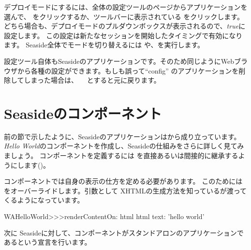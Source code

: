\documentclass[a4paper,10pt,twoside]{book}
\begin{document}
{{デプロイモードにするには、全体の設定ツールのページからアプリケーションを選んで、  をクリックするか、ツールバーに表示されている  をクリックします。
どちら場合も、デプロイモードのプルダウンボックスが表示されるので、\emph{true}に設定します。
この設定は新たなセッションを開始したタイミングで有効になります。
Seaside全体でモードを切り替えるには や、を実行します。


設定ツール自体もSeasideのアプリケーションです。そのため同じようにWebブラウザから各種の設定ができます。もしも誤って``config'' のアプリケーションを削除してしまった場合は、
 　とすると元に戻ります。

\section{Seasideのコンポーネント}


前の節で示したように、Seasideのアプリケーションは\emph{}から成り立っています。
\emph{Hello World}のコンポーネントを作成し、Seasideの仕組みをさらに詳しく見てみましょう。
コンポーネントを定義するには を直接あるいは間接的に継承するようにします()。


コンポーネントでは自身の表示の仕方を定める必要があります。
このためにはをオーバーライドします。引数として XHTMLの生成方法を知っているが渡ってくるようになっています。

\begin{code}{}
WAHelloWorld>>>renderContentOn: html
	html text: 'hello world'
\end{code}

\noindent
次に Seasideに対して、コンポーネントがスタンドアロンのアプリケーションであるという宣言を行います。

}}
\end{document}
